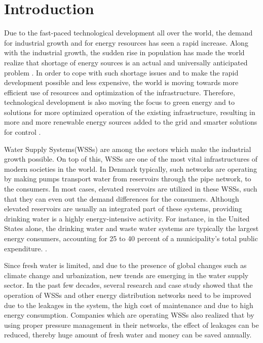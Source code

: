 \chapter{Introduction}
\label{introduction}

Due to the fast-paced technological development all over the world, the demand for industrial growth and for energy resources has seen a rapid increase. Along with the industrial growth, the sudden rise in population has made the world realize that shortage of energy sources is an actual and universally anticipated problem \cite{sustainable_water}. In order to cope with such shortage issues and to make the rapid development possible and less expensive, the world is moving towards more efficient use of resources and optimization of the infrastructure. Therefore, technological development is also moving the focus to green energy and to solutions for more optimized operation of the existing infrastructure, resulting in more and more renewable energy sources added to the grid and smarter solutions for control \cite{fluctuating_price}. 

Water Supply Systems(WSSs) are among the sectors which make the industrial growth possible. On top of this, WSSs are one of the most vital infrastructures of modern societies in the world. In Denmark typically, such networks are operating by making pumps transport water from reservoirs through the pipe network, to the consumers. In most cases, elevated reservoirs are utilized in these WSSs, such that they can even out the demand differences for the consumers. Although elevated reservoirs are usually an integrated part of these systems, providing drinking water is a highly energy-intensive activity. For instance, in the United States alone, the drinking water and waste water systems are typically the largest energy consumers, accounting for 25 to 40 percent of a municipality's total public expenditure. \cite{appelbaum2002water}. 

Since fresh water is limited, and due to the presence of global changes such as climate change and urbanization, new trends are emerging in the water supply sector. In the past few decades, several research and case study showed that the operation of WSSs and other energy distribution networks need to be improved due to the leakages in the system, the high cost of maintenance and due to high energy consumption. Companies which are operating WSSs also realized that by using proper pressure management in their networks, the effect of leakages can be reduced, thereby huge amount of fresh water and money can be saved annually\cite{national2005public}. 

